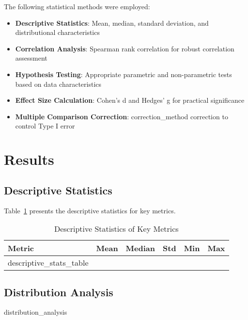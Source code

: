 \documentclass[11pt,a4paper]{article}
\begin{document}
The following statistical methods were employed:

\begin{itemize}
    \item \textbf{Descriptive Statistics}: Mean, median, standard deviation, and distributional characteristics
    \item \textbf{Correlation Analysis}: Spearman rank correlation for robust correlation assessment
    \item \textbf{Hypothesis Testing}: Appropriate parametric and non-parametric tests based on data characteristics
    \item \textbf{Effect Size Calculation}: Cohen's d and Hedges' g for practical significance
    \item \textbf{Multiple Comparison Correction}: {{ correction_method }} correction to control Type I error
\end{itemize}

\section{Results}

\subsection{Descriptive Statistics}

Table~\ref{tab:descriptive} presents the descriptive statistics for key metrics.

\begin{table}[H]
\centering
\caption{Descriptive Statistics of Key Metrics}
\label{tab:descriptive}
\begin{tabular}{lrrrrr}
\toprule
\textbf{Metric} & \textbf{Mean} & \textbf{Median} & \textbf{Std} & \textbf{Min} & \textbf{Max} \\
\midrule
{{ descriptive_stats_table }}
\bottomrule
\end{tabular}
\end{table}

\subsection{Distribution Analysis}

{{ distribution_analysis }}
\end{document}
